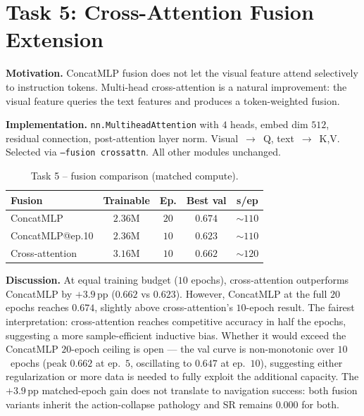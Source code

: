 \documentclass[10pt, twocolumn]{article}
\begin{document}
\section{Task 5: Cross-Attention Fusion Extension}\label{sec:task5}

\textbf{Motivation.} ConcatMLP fusion does not let the visual feature
attend selectively to instruction tokens. Multi-head cross-attention is
a natural improvement: the visual feature queries the text features and
produces a token-weighted fusion.

\textbf{Implementation.} \texttt{nn.MultiheadAttention} with $4$ heads,
embed dim $512$, residual connection, post-attention layer norm.
Visual~$\to$~Q, text~$\to$~K,V. Selected via \texttt{--fusion crossattn}.
All other modules unchanged.

\begin{table}[ht]\centering\small
\caption{Task 5 -- fusion comparison (matched compute).}
\begin{tabular}{lcccc}\toprule
Fusion & Trainable & Ep. & Best val & s/ep \\\midrule
ConcatMLP        & $2.36$M & $20$ & $\mathbf{0.674}$ & $\sim\!110$ \\
ConcatMLP@ep.10  & $2.36$M & $10$ & $0.623$          & $\sim\!110$ \\
Cross-attention  & $3.16$M & $10$ & $0.662$          & $\sim\!120$ \\
\bottomrule
\end{tabular}
\label{tab:fusion}
\end{table}

\textbf{Discussion.} At equal training budget ($10$ epochs),
cross-attention outperforms ConcatMLP by $\mathbf{+3.9}$\,pp
($0.662$ vs $0.623$). However, ConcatMLP at the full $20$ epochs reaches
$0.674$, slightly above cross-attention's $10$-epoch result. The fairest
interpretation: cross-attention reaches competitive accuracy in half the
epochs, suggesting a more sample-efficient inductive bias. Whether it
would exceed the ConcatMLP $20$-epoch ceiling is open --- the val curve
is non-monotonic over $10$~epochs (peak $0.662$ at ep.~$5$, oscillating
to $0.647$ at ep.~$10$), suggesting either regularization or more data
is needed to fully exploit the additional capacity. The $+3.9$\,pp
matched-epoch gain does not translate to navigation success: both
fusion variants inherit the action-collapse pathology and SR remains
$0.000$ for both.
\end{document}
